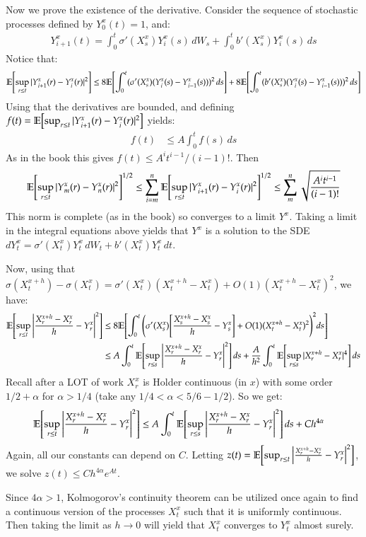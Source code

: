 \documentclass[12pt]{article}
\theoremstyle{definitionstyle}
\newcommand{\1}{\mathds 1}
\newcommand{\E}{\mathbb E \qty}
\begin{document}
    Now we prove the existence of the derivative. Consider the sequence of stochastic processes defined by $Y_0^x(t) = 1$, and:
    \begin{align*}
        Y_{i+1}^x(t) = \int_0^t \sigma'(X_s^x) Y_i^x(s) \, dW_s + \int_0^t b'(X_s^x) Y_i^x(s) \, ds
    \end{align*}
    Notice that:
    \begin{align*}
        \E[\sup_{r \leq t} |Y_{i+1}^x(r) - Y_i^x(r)|^2] &\leq 8\E[\int_0^t (\sigma'(X_s^x)(Y_i^x(s) - Y_{i-1}^x(s)))^2 \, ds] + 8\E[\int_0^t (b'(X_s^x)(Y_i^x(s) - Y_{i-1}^x(s)))^2 \, ds] \\
    \end{align*}
    Using that the derivatives are bounded, and defining $f(t) = \E[\sup_{r \leq t} |Y_{i+1}^x(r) - Y_i^x(r)|^2]$ yields:
    \begin{align*}
        f(t) &\leq A \int_0^t f(s) \, ds
    \end{align*}
    As in the book this gives $f(t) \leq A^i t^{i-1} / (i-1)!$. Then 
    \begin{align*}
        \E[\sup_{r \leq t} |Y_m^x(r) - Y_n^x(r)|^2]^{1/2} \leq \sum_{i=m}^n \E[\sup_{r \leq t} |Y_{i+1}^x(r) - Y_i^x(r)|^2]^{1/2} \leq \sum_{m}^n \sqrt{\frac{A^i t^{i-1}}{(i-1)!}}
    \end{align*}
    This norm is complete (as in the book) so converges to a limit $Y^x$. Taking a limit in the integral equations above yields that $Y^x$ is a solution to the SDE $dY^x_t = \sigma'(X_t^x) Y^x_t\, dW_t + b'(X_t^x) Y^x_t \, dt$. 

    Now, using that $\sigma(X_t^{x+h}) - \sigma(X_t^x) = \sigma'(X_t^x)(X_t^{x+h} - X_t^x) + O(1) (X_t^{x+h}-X_t^x)^2$, we have:
    \begin{align*}
        \E[\sup_{r \leq t} \qty|\frac{X^{x+h}_r - X^x_r}{h} - Y^x_r|^2] &\leq 8\E[\int_0^t \qty(\sigma'(X_s^x) \qty[\frac{X_s^{x+h}-X_s^x}{h} - Y_s^x] + O(1)(X_t^{x+h}-X_t^x)^2)^2ds] \\
        &\leq A\int_0^t \E[\sup_{r \leq s} \qty|\frac{X^{x+h}_r - X^x_r}{h} - Y^x_r|^2] \, ds + \frac{A}{h^2} \int_0^t \E[\sup_{r \leq s} |X^{x+h}_r - X^x_r|^4] \, ds
    \end{align*}
    Recall after a LOT of work $X_r^{x}$ is Holder continuous (in $x$) with some order $1/2 + \alpha$ for $\alpha > 1/4$ (take any $1/4 < \alpha < 5/6 - 1/2$). So we get:
    \begin{align*}
        \E[\sup_{r \leq t} \qty|\frac{X_r^{x+h} - X_r^x}{h} - Y^x_r|^2] &\leq A\int_0^t \E[\sup_{r \leq s} \qty|\frac{X^{x+h}_r - X^x_r}{h} - Y^x_r|^2] \, ds + C h^{4\alpha}
    \end{align*}
    Again, all our constants can depend on $C$. Letting $z(t) = \E[\sup_{r \leq t} \qty|\frac{X_r^{x+h} - X_r^x}{h} - Y^x_r|^2]$, we solve $z(t) \leq Ch^{4\alpha}e^{At}$. 

    Since $4\alpha > 1$, Kolmogorov's continuity theorem can be utilized once again to find a continuous version of the processes $X_t^x$ such that it is uniformly continuous. Then taking the limit as $h \to 0$ will yield that $X_t^{x}$ converges to $Y_t^x$ almost surely. 
\end{document}
